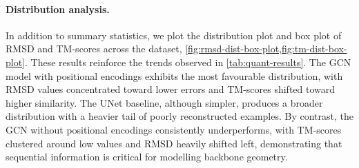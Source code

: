 \documentclass[a4paper,12pt]{article}
\begin{document}
\paragraph{Distribution analysis.}
In addition to summary statistics, we plot the distribution plot and box plot of RMSD and TM-scores across the dataset, \cref{fig:rmsd-dist-box-plot,fig:tm-dist-box-plot}. These results reinforce the trends observed in \cref{tab:quant-results}. The GCN model with positional encodings exhibits the most favourable distribution, with RMSD values concentrated toward lower errors and TM-scores shifted toward higher similarity. The UNet baseline, although simpler, produces a broader distribution with a heavier tail of poorly reconstructed examples. By contrast, the GCN without positional encodings consistently underperforms, with TM-scores clustered around low values and RMSD heavily shifted left, demonstrating that sequential information is critical for modelling backbone geometry.
\end{document}
